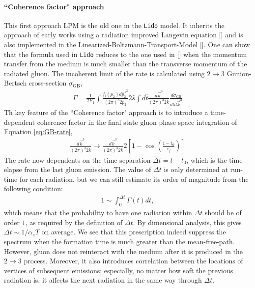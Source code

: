 \documentclass[aps, prc, reprint, amsmath, groupedaddress, nofootinbib]{revtex4-1}
\begin{document}
\paragraph*{``Coherence factor" approach} This first approach LPM is the old one in the {\tt Lido} model. 
It inherits the approach of early works using a radiation improved Langevin equation [] and is also implemented in the Linearized-Boltzmann-Transport-Model []. 
One can show that the formula used in {\tt Lido} reduces to the one used in [] when the momentum transfer from the medium is much smaller than the transverse momentum of the radiated gluon.
The incoherent limit of the rate is calculated using $2\rightarrow 3$ Gunion-Bertsch cross-section $\sigma_\textrm{GB}$,
\begin{eqnarray}\label{eq:GB-rate}
\Gamma = \frac{1}{2E_1}\int\frac{f_i(p_2)d\vec{p_2}^3}{(2\pi)^3 2p_2}2\hat{s}\int d\hat{t}\frac{d\vec{k}^3}{(2\pi)^3 2k}\frac{d\sigma_{\textrm{GB}}}{d\hat{t}d\vec{k}^3}
\end{eqnarray}
Th key feature of the ``Coherence factor" approach is to introduce a time-dependent coherence factor in the final state gluon phase space integration of Equation \ref{eq:GB-rate},
\begin{eqnarray}
\frac{d\vec{k}^3}{(2\pi)^3 2k} \rightarrow \frac{d\vec{k}^3}{(2\pi)^3 2k} 2\left[1-\cos\left(\frac{t-t_0}{\tau_f}\right)\right]
\end{eqnarray}
The rate now dependents on the time separation $\Delta t = t-t_0$, which is the time elapse from the last gluon emission.
The value of $\Delta t$ is only determined at run-time for each radiation,
but we can still estimate its order of magnitude from the following condition:
\begin{eqnarray}
1 \sim \int_0^{\Delta t}\Gamma(t) dt,
\end{eqnarray}
which means that the probability to have one radiation within $\Delta t$ should be of order $1$, as required by the definition of $\Delta t$.
By dimensional analysis, this gives $\Delta t \sim 1/\alpha_s T$ on average.
We see that this prescription indeed suppress the spectrum when the formation time is much greater than the mean-free-path.
However, gluon does not reinteract with the medium after it is produced in the $2\rightarrow3$ process.
Moreover, it also introduces correlation between the locations of vertices of subsequent emissions;
especially, no matter how soft the previous radiation is, it affects the next radiation in the same way through $\Delta t$.
\end{document}
